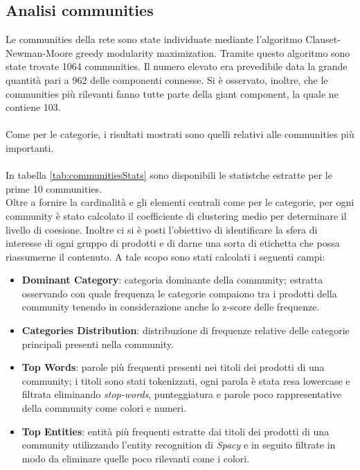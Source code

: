 \subsection{Analisi communities}
Le communities della rete sono state individuate mediante l'algoritmo Clauset-Newman-Moore greedy modularity maximization. Tramite questo algoritmo sono state trovate 1064 communities. Il numero elevato era prevedibile data la grande quantità pari a 962 delle componenti connesse. Si è osservato, inoltre, che le communities più rilevanti fanno tutte parte della giant component, la quale ne contiene 103. \\\\
Come per le categorie, i risultati mostrati sono quelli relativi alle communities più importanti. 
\\\\
In tabella \ref{tab:communitiesStats} sono disponibili le statistche estratte per le prime 10 communities. \\
Oltre a fornire la cardinalità e gli elementi centrali come per le categorie, per ogni community è stato calcolato il coefficiente di clustering medio per determinare il livello di coesione.  Inoltre ci si è posti l'obiettivo di identificare la sfera di interesse di ogni gruppo di prodotti e di darne una sorta di etichetta che possa riassumerne il contenuto. A tale scopo sono stati calcolati i seguenti campi:
\begin{itemize}
    \item \textbf{Dominant Category}: categoria dominante della community; estratta osservando con quale frequenza le categorie compaiono tra i prodotti della community tenendo in considerazione anche lo z-score delle frequenze.
    \item \textbf{Categories Distribution}: distribuzione di frequenze relative delle categorie principali presenti nella community.
    \item \textbf{Top Words}: parole più frequenti presenti nei titoli dei prodotti di una community; i titoli sono stati tokenizzati, ogni parola è stata resa lowercase e filtrata eliminando \textit{stop-words}, punteggiatura e parole poco rappresentative della community come colori e numeri.
    \item \textbf{Top Entities}: entità più frequenti estratte dai titoli dei prodotti di una community utilizzando l'entity recognition di \textit{Spacy} e in seguito filtrate in modo da eliminare quelle poco rilevanti come i colori.
\end{itemize}


